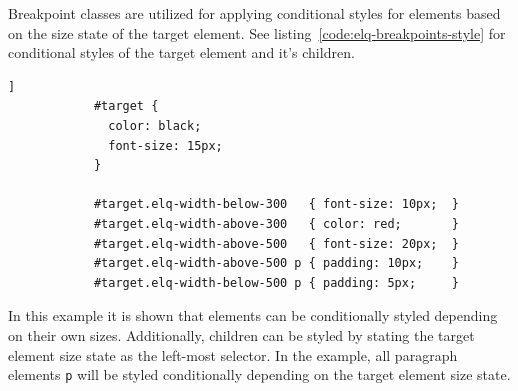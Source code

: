 \documentclass[a4paper,11pt]{kth-mag}
\newcommand{\code}[1]{\texttt{#1}}
\begin{document}
          Breakpoint classes are utilized for applying conditional styles for elements based on the size state of the target element.
          See listing~\ref{code:elq-breakpoints-style} for conditional styles of the target element and it's children.
          \begin{lstlisting}[gobble=12,caption={Example of conditional styles using the \code{elq-breakpoints} plugin classes},captionpos=b,label={code:elq-breakpoints-style}]]
            #target {
              color: black;
              font-size: 15px;
            }

            #target.elq-width-below-300   { font-size: 10px;  }
            #target.elq-width-above-300   { color: red;       }
            #target.elq-width-above-500   { font-size: 20px;  }
            #target.elq-width-above-500 p { padding: 10px;    }
            #target.elq-width-below-500 p { padding: 5px;     }
          \end{lstlisting}
          In this example it is shown that elements can be conditionally styled depending on their own sizes.
          Additionally, children can be styled by stating the target element size state as the left-most selector.
          In the example, all paragraph elements \code{p} will be styled conditionally depending on the target element size state.


\end{document}
